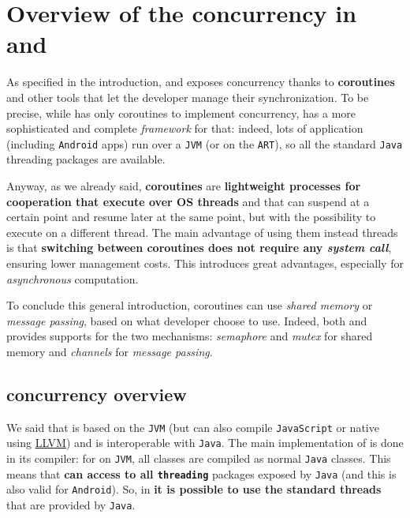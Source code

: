 \section{Overview of the concurrency in \Kotlin and \Go}

As specified in the introduction, \Kotlin and \Go exposes concurrency thanks to \textbf{coroutines} and other tools that let the developer manage their synchronization. To be precise, while \Go has only coroutines to implement concurrency, \Kotlin has a more sophisticated and complete \textit{framework} for that: indeed, lots of \Kotlin application (including \texttt{Android} apps) run over a \texttt{JVM} (or on the \texttt{ART}), so all the standard \texttt{Java} threading packages are available.

Anyway, as we already said, \textbf{coroutines} are \textbf{lightweight processes for cooperation that execute over OS threads} and that can suspend at a certain point and resume later at the same point, but with the possibility to execute on a different thread. The main advantage of using them instead threads is that \textbf{switching between coroutines does not require any \textit{system call}}, ensuring lower management costs.
This introduces great advantages, especially for \textit{asynchronous} computation.

To conclude this general introduction, coroutines can use \textit{shared memory} or \textit{message passing}, based on what developer choose to use. Indeed, both \Kotlin and \Go provides supports for the two mechanisms: \textit{semaphore} and \textit{mutex} for shared memory and \textit{channels} for \textit{message passing}.

\subsection{\Kotlin concurrency overview}

We said that \Kotlin is based on the \texttt{JVM} (but can also compile \texttt{JavaScript} or native using \href{https://llvm.org/}{LLVM}) and is interoperable with \texttt{Java}. The main implementation of \Kotlin is done in its compiler: for \Kotlin on \texttt{JVM}, all classes are compiled as normal \texttt{Java} classes. This means that \textbf{\Kotlin can access to all \texttt{threading}} packages exposed by \texttt{Java} (and this is also valid for \texttt{Android}). So, in \Kotlin \textbf{it is possible to use the standard threads} that are provided by \texttt{Java}.

